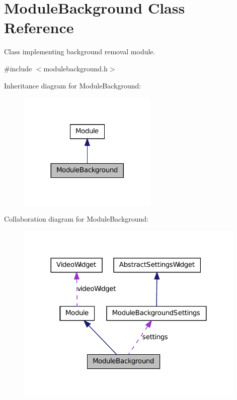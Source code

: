 \hypertarget{class_module_background}{
\section{ModuleBackground Class Reference}
\label{d0/deb/class_module_background}
}


Class implementing background removal module.  




{\ttfamily \#include $<$modulebackground.h$>$}



Inheritance diagram for ModuleBackground:\nopagebreak
\begin{figure}[H]
\begin{center}
\leavevmode
\includegraphics[width=188pt]{d3/dfe/class_module_background__inherit__graph}
\end{center}
\end{figure}


Collaboration diagram for ModuleBackground:\nopagebreak
\begin{figure}[H]
\begin{center}
\leavevmode
\includegraphics[width=311pt]{de/dbe/class_module_background__coll__graph}
\end{center}
\end{figure}
